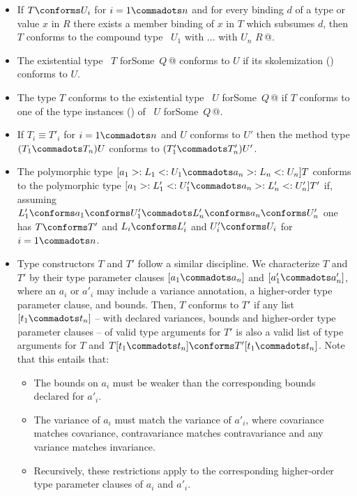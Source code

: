 \begin{itemize}
\item If $T \conforms U_i$ for $i = 1 \commadots n$ and for every
      binding $d$ of a type or value $x$ in $R$ there exists a member
      binding of $x$ in $T$ which subsumes $d$, then $T$ conforms to the
      compound type ~\lstinline@$U_1$ with $\ldots$ with $U_n$ {$R\,$}@.
\item The existential type ~\lstinline@$T$ forSome {$\,Q\,$}@ conforms to 
      $U$ if its skolemization ()
      conforms to $U$.
\item The type $T$ conforms to the existential type ~\lstinline@$U$ forSome {$\,Q\,$}@ 
      if $T$ conforms to one of the type instances () 
      of ~\lstinline@$U$ forSome {$\,Q\,$}@.
\item If
        $T_i \equiv T'_i$ for $i = 1 \commadots n$ and $U$ conforms to $U'$ 
        then the method type $(T_1 \commadots T_n) U$ conforms to
        $(T'_1 \commadots T'_n) U'$.
\item The polymorphic type
$[a_1 >: L_1 <: U_1 \commadots a_n >: L_n <: U_n] T$ conforms to the polymorphic type
$[a_1 >: L'_1 <: U'_1 \commadots a_n >: L'_n <: U'_n] T'$ if, assuming
$L'_1 \conforms a_1 \conforms U'_1 \commadots L'_n \conforms a_n \conforms U'_n$ 
one has $T \conforms T'$ and $L_i \conforms L'_i$ and $U'_i \conforms U_i$
for $i = 1 \commadots n$.
\item Type constructors $T$ and $T'$ follow a similar discipline. We characterize $T$ and $T'$ by their type parameter clauses
$[a_1 \commadots a_n]$ and
$[a'_1 \commadots a'_n ]$, where an $a_i$ or $a'_i$ may include a variance annotation, a higher-order type parameter clause, and bounds. Then, $T$ conforms to $T'$ if any list $[t_1 \commadots t_n]$ -- with declared variances, bounds and higher-order type parameter clauses -- of valid type arguments for $T'$ is also a valid list of type arguments for $T$ and $T[t_1 \commadots t_n] \conforms T'[t_1 \commadots t_n]$. Note that this entails that:
      \begin{itemize}
      \item
      The bounds on $a_i$ must be weaker than the corresponding bounds declared for $a'_i$. 
      \item 
      The variance of $a_i$ must match the variance of $a'_i$, where covariance matches covariance, contravariance matches contravariance and any variance matches invariance.
      \item 
      Recursively, these restrictions apply to the corresponding higher-order type parameter clauses of $a_i$ and $a'_i$.
      \end{itemize}

\end{itemize}

